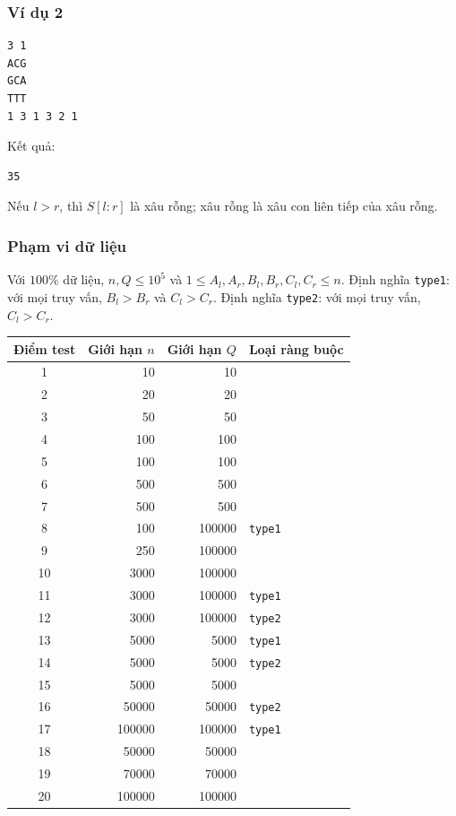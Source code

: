 \documentclass[11pt]{article}
\begin{document}
\subsubsection{Ví dụ 2}

\begin{verbatim}
3 1
ACG
GCA
TTT
1 3 1 3 2 1
\end{verbatim}

Kết quả:
\begin{verbatim}
35
\end{verbatim}

Nếu \(l>r\), thì \(S[l:r]\) là xâu rỗng; xâu rỗng là xâu con liên tiếp của xâu
rỗng.

\subsubsection{Phạm vi dữ liệu}

Với \(100\%\) dữ liệu, \(n,Q\le 10^5\) và
\(1\le A_l,A_r,B_l,B_r,C_l,C_r\le n\).
Định nghĩa \texttt{type1}: với mọi truy vấn, \(B_l>B_r\) và \(C_l>C_r\).
Định nghĩa \texttt{type2}: với mọi truy vấn, \(C_l>C_r\).

\begin{center}
\small
\begin{tabular}{c r r l}
\hline
Điểm test & Giới hạn \(n\) & Giới hạn \(Q\) & Loại ràng buộc \\
\hline
1 & 10 & 10 & \\
2 & 20 & 20 & \\
3 & 50 & 50 & \\
4 & 100 & 100 & \\
5 & 100 & 100 & \\
6 & 500 & 500 & \\
7 & 500 & 500 & \\
8 & 100 & 100000 & \texttt{type1} \\
9 & 250 & 100000 & \\
10 & 3000 & 100000 & \\
11 & 3000 & 100000 & \texttt{type1} \\
12 & 3000 & 100000 & \texttt{type2} \\
13 & 5000 & 5000 & \texttt{type1} \\
14 & 5000 & 5000 & \texttt{type2} \\
15 & 5000 & 5000 & \\
16 & 50000 & 50000 & \texttt{type2} \\
17 & 100000 & 100000 & \texttt{type1} \\
18 & 50000 & 50000 & \\
19 & 70000 & 70000 & \\
20 & 100000 & 100000 & \\
\hline
\end{tabular}
\end{center}
\end{document}
